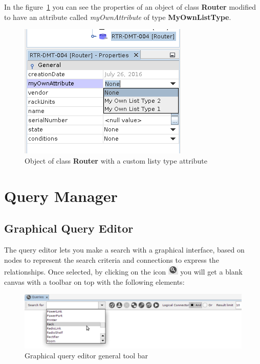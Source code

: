 \documentclass[a4paper]{article}
\begin{document}
	 In the figure~\ref{fig:list_type_applied_types} you can see the properties of an object of class \textbf{Router} modified to have an attribute called \textit{myOwnAttribute} of type \textbf{MyOwnListType}.\newline
	 \begin{figure}[h!]
	 	\centering
	 	\includegraphics[width=0.4\linewidth]{img/list_type_applied_types.png}
	 	\caption{Object of class \textbf{Router} with a custom listy type attribute}
	 	\label{fig:list_type_applied_types}
	 \end{figure}
	 
	\clearpage
	\section{Query Manager} \label{sec:querying}
	\subsection{Graphical Query Editor} 
	The query editor lets you make a search with a graphical interface, based on nodes to represent the search criteria and connections to express the relationships. Once selected, by clicking on the icon \includegraphics[width=0.5cm]{img/icon_query_manager.png} you will get a blank canvas with a toolbar on top with the following elements:
	\begin{figure}[h!]
		\centering
		\includegraphics[width=1.1\linewidth]{img/query_tool_bar.png}
		\caption{Graphical query editor general tool bar}
		\label{fig:query_tool_bar}
	\end{figure}
	
\end{document}

